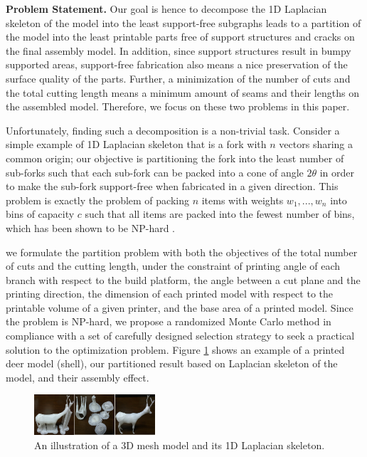 \textbf{Problem Statement.} Our goal is hence to decompose the 1D Laplacian skeleton of the model into the least support-free subgraphs leads to a partition of the model into the least printable parts free of support structures and cracks on the final assembly model. In addition, since support structures result in bumpy supported areas, support-free fabrication also means a nice preservation of the surface quality of the parts. Further, a minimization of the number of cuts and the total cutting length means a minimum amount of seams and their lengths on the assembled model. Therefore, we focus on these two problems in this paper.

Unfortunately, finding such a decomposition is a non-trivial task. Consider a simple example of 1D Laplacian skeleton that is a fork with $n$ vectors sharing a common origin; our objective is partitioning the fork into the least number of sub-forks such that each sub-fork can be packed into a cone of angle $2\theta$ in order to make the sub-fork support-free when fabricated in a given direction. This problem is exactly the problem of packing $n$ items with weights $w_1, ..., w_n$ into bins of capacity $c$ such that all items are packed into the fewest number of bins, which has been shown to be NP-hard \cite{Fukunaga:2007}.

we formulate the partition problem with both the objectives of the total number of cuts and the cutting length, under the constraint of printing angle of each branch with respect to the build platform, the angle between a cut plane and the printing direction, the dimension of each printed model with respect to the printable volume of a given printer, and the base area of a printed model. Since the problem is NP-hard, we propose a randomized Monte Carlo method in compliance with a set of carefully designed selection strategy to seek a practical solution to the optimization problem. Figure \ref{fig:ex1} shows an example of a printed deer model (shell), our partitioned result based on Laplacian skeleton of the model, and their assembly effect.

\begin{figure}[t]
  \centering
  \includegraphics[width=0.4\textwidth]{figs/tree_with_skeleton.png}
  \caption{\label{fig:ex1}%
           An illustration of a 3D mesh model and its 1D Laplacian skeleton. }
\end{figure}